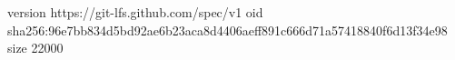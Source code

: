 version https://git-lfs.github.com/spec/v1
oid sha256:96e7bb834d5bd92ae6b23aca8d4406aeff891c666d71a57418840f6d13f34e98
size 22000
